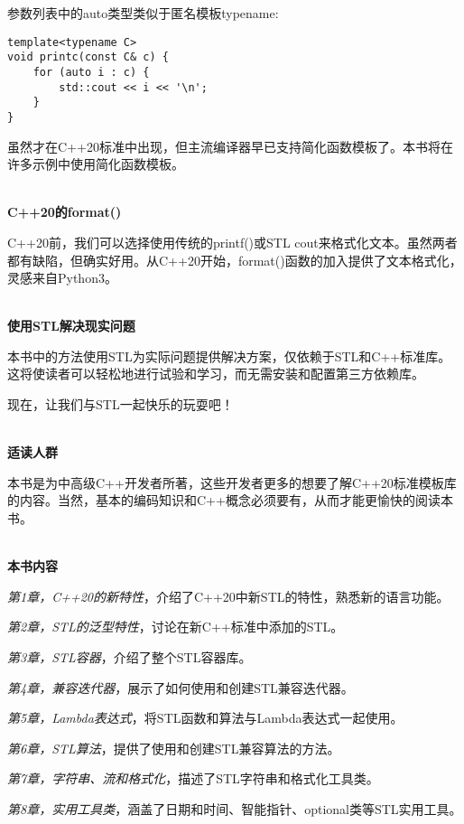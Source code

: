 参数列表中的auto类型类似于匿名模板typename:

\begin{lstlisting}[style=styleCXX]
template<typename C>
void printc(const C& c) {
	for (auto i : c) {
		std::cout << i << '\n';
	}
}
\end{lstlisting}

虽然才在C++20标准中出现，但主流编译器早已支持简化函数模板了。本书将在许多示例中使用简化函数模板。

\hspace*{\fill} \\ %
\noindent
\textbf{C++20的format()}

C++20前，我们可以选择使用传统的printf()或STL cout来格式化文本。虽然两者都有缺陷，但确实好用。从C++20开始，format()函数的加入提供了文本格式化，灵感来自Python3。

\hspace*{\fill} \\ %
\noindent
\textbf{使用STL解决现实问题}

本书中的方法使用STL为实际问题提供解决方案，仅依赖于STL和C++标准库。这将使读者可以轻松地进行试验和学习，而无需安装和配置第三方依赖库。

现在，让我们与STL一起快乐的玩耍吧！

\hspace*{\fill} \\ %
\noindent
\textbf{适读人群}

本书是为中高级C++开发者所著，这些开发者更多的想要了解C++20标准模板库的内容。当然，基本的编码知识和C++概念必须要有，从而才能更愉快的阅读本书。

\hspace*{\fill} \\ %
\noindent
\textbf{本书内容}

\textit{第1章，C++20的新特性}，介绍了C++20中新STL的特性，熟悉新的语言功能。

\textit{第2章，STL的泛型特性}，讨论在新C++标准中添加的STL。

\textit{第3章，STL容器}，介绍了整个STL容器库。

\textit{第4章，兼容迭代器}，展示了如何使用和创建STL兼容迭代器。

\textit{第5章，Lambda表达式}，将STL函数和算法与Lambda表达式一起使用。

\textit{第6章，STL算法}，提供了使用和创建STL兼容算法的方法。

\textit{第7章，字符串、流和格式化}，描述了STL字符串和格式化工具类。

\textit{第8章，实用工具类}，涵盖了日期和时间、智能指针、optional类等STL实用工具。

